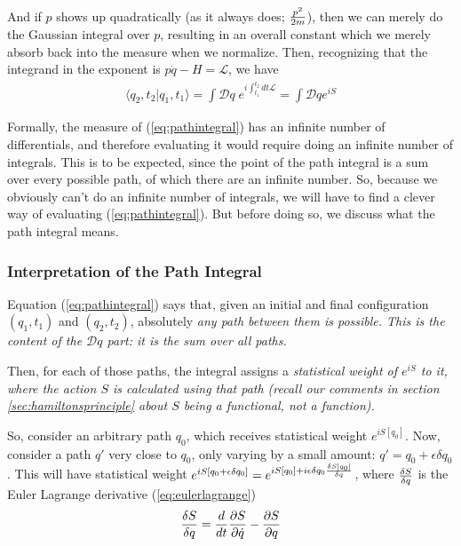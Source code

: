 \documentclass[12pt,epsf]{article}
\def\nolabel{\nonumber }
\def\nolabel{\nonumber }
\begin{document}
And if $p$ shows up quadratically (as it always does; ${p^2 \over
2m}$), then we can merely do the Gaussian integral over $p$, resulting
in an overall constant which we merely absorb back into the measure
when we normalize.  Then, recognizing that the integrand in the
exponent is $p\dot{q} - H = \mathcal{L}$, we have 
\begin{eqnarray}
\langle q_2,t_2|q_1,t_1\rangle = \int \mathcal{D}q \; e^{i
\int_{t_1}^{t_2} dt \mathcal{L}} = \int \mathcal{D}qe^{iS}
\label{eq:pathintegral}
\end{eqnarray}

Formally, the measure of (\ref{eq:pathintegral}) has an infinite number
of differentials, and therefore evaluating it would require doing an
infinite number of integrals.  This is to be expected, since the point
of the path integral is a sum over every possible path, of which there
are an infinite number.  So, because we obviously can't do an infinite
number of integrals, we will have to find a clever way of evaluating
(\ref{eq:pathintegral}).  But before doing so, we discuss what the path
integral means.  

\subsubsection{Interpretation of the Path Integral}

Equation (\ref{eq:pathintegral}) says that, given an initial and final
configuration $(q_1,t_1)$ and $(q_2,t_2)$, absolutely \it any \rm path
between them is possible.  This is the content of the $\mathcal{D}q$
part:  it is the sum over all paths.  

Then, for each of those paths, the integral assigns a \it statistical
weight \rm of $e^{iS}$ to it, where the action $S$ is calculated using
\it that \rm path (recall our comments in section
\ref{sec:hamiltonsprinciple} about $S$ being a functional, not a
function).  

So, consider an arbitrary path $q_0$, which receives statistical weight
$e^{iS[q_0]}$.	Now, consider a path $q'$ very close to $q_0$, only
varying by a small amount: $q' = q_0 + \epsilon \delta q_0$.  This will
have statistical weight $e^{iS[q_0 + \epsilon \delta q_0]} = e^{iS[q_0]
+ i\epsilon \delta q_0 {\delta S[q_0] \over \delta q}}$, where ${\delta
S \over \delta q}$ is the Euler Lagrange derivative
(\ref{eq:eulerlagrange})
\begin{eqnarray}
{\delta S \over \delta q} = {d \over dt} {\partial S \over \partial
\dot{q}} - {\partial S \over \partial q}\nolabel
\end{eqnarray}
\end{document}
